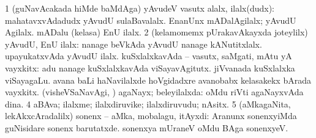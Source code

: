 \bentry
{}
\gl{\nA}
\bmng
\bnum
\num{1} (guNavAcakada hiMde baMdAga) yAvudeV vasutx alalx, ilalx(dudx):  mahatavxvAdadudx yAvudU sulaBavalalx.  EnanUnx mADalAgilalx; yAvudU Agilalx.  mADalu (kelasa) EnU ilalx. 
\num{2} (kelamomemx pUrakavAkayxda joteylilx) yAvudU, EnU ilalx:  nanage beVkAda yAvudU nanage kANutitxlalx.  upayukatxvAda yAvudU ilalx. 
\banum
{} kuSxlalxkavAda -- vasutx, saMgati, mAtu yA vayxkitx:  adu nanage kuSxlalxkavAda viSayavAgitutx.  jiVvanada kuSxlalxka viSayagaLu.  avana baLi haNavilalxde hoVgidadxre avanobabx kelasakekx bArada vayxkitx. 
 (visheVSaNavAgi, \AmA) agaNayx; beleyilalxda:  oMdu riVti agaNayxvAda dina. 
\eanum
\numie
\num{4} aBAva; ilalxme; ilalxdiruvike; ilalxdiruvudu; nAsitx. 
\num{5} (aMkagaNita, lekAkxcAradalilx) sonenx -- aMka, mobalagu, itAyxdi:  Aranunx sonenxyiMda guNisidare sonenx barutatxde.  sonenxya mUraneV oMdu BAga sonenxyeV. 
\enum
\emng

